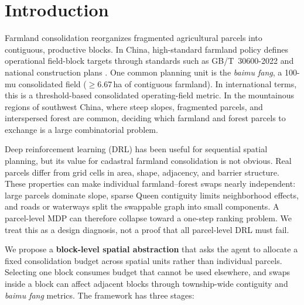\documentclass[preprint,12pt]{elsarticle}
\begin{document}

\section{Introduction}
\label{sec:intro}

Farmland consolidation reorganizes fragmented agricultural parcels into contiguous, productive blocks. In China, high-standard farmland policy defines operational field-block targets through standards such as GB/T~30600-2022 \citep{gbt30600_2022} and national construction plans \citep{moa2021plan}. One common planning unit is the \textit{baimu fang}, a 100-mu consolidated field ($\geq$6.67\,ha of contiguous farmland). In international terms, this is a threshold-based consolidated operating-field metric. In the mountainous regions of southwest China, where steep slopes, fragmented parcels, and interspersed forest are common, deciding which farmland and forest parcels to exchange is a large combinatorial problem.

Deep reinforcement learning (DRL) has been useful for sequential spatial planning, but its value for cadastral farmland consolidation is not obvious. Real parcels differ from grid cells in area, shape, adjacency, and barrier structure. These properties can make individual farmland--forest swaps nearly independent: large parcels dominate slope, sparse Queen contiguity limits neighborhood effects, and roads or waterways split the swappable graph into small components. A parcel-level MDP can therefore collapse toward a one-step ranking problem. We treat this as a design diagnosis, not a proof that all parcel-level DRL must fail.

We propose a \textbf{block-level spatial abstraction} that asks the agent to allocate a fixed consolidation budget across spatial units rather than individual parcels. Selecting one block consumes budget that cannot be used elsewhere, and swaps inside a block can affect adjacent blocks through township-wide contiguity and \textit{baimu fang} metrics. The framework has three stages:
\end{document}

